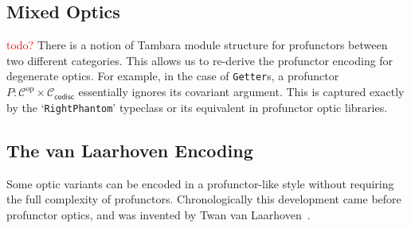\documentclass[11pt,letterpaper]{article}
\makeatletter
\theoremstyle{plain}
\newtheorem{theorem}{Theorem}[subsection]
\theoremstyle{definition}
\newcommand{\C}{\mathscr{C}}
\newcommand{\id}{\mathrm{id}}
\newcommand{\op}{\mathrm{op}}
\newcommand{\hto}{\ensuremath{\,\mathaccent\shortmid\rightarrow\,}}
\providecommand{\leftsquigarrow}{%
  \mathrel{\mathpalette\reflect@squig\relax}%
}
\newcommand{\reflect@squig}[2]{%
  \reflectbox{$\m@th#1\rightsquigarrow$}%
}
\newcommand{\todo}[1]{\textcolor{red}{\small #1}}
\makeatother
\begin{document}
%
%
%

\subsection{Mixed Optics}
\todo{todo?}
There is a notion of Tambara module structure for profunctors between two different categories. This allows us to re-derive the profunctor encoding for degenerate optics. For example, in the case of \texttt{Getter}s, a profunctor $P : \C^\op \times \C_\mathsf{codisc}$ essentially ignores its covariant argument. This is captured exactly by the `\texttt{RightPhantom}' typeclass or its equivalent in profunctor optic libraries.

\subsection{The van Laarhoven Encoding}

Some optic variants can be encoded in a profunctor-like style without requiring the full complexity of profunctors. Chronologically this development came before profunctor optics, and was invented by Twan van Laarhoven~\cite{VanLaarhovenPost}.
\end{document}
